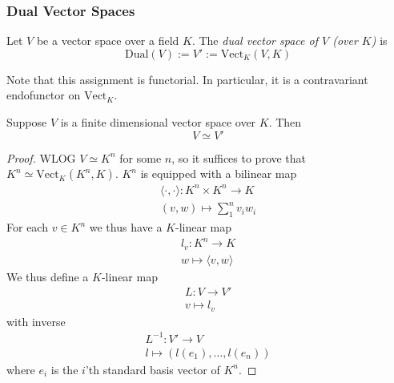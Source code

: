 \subsubsection{Dual Vector Spaces}
    \begin{definition}
        Let $V$ be a vector space over a field $K$. The \emph{dual vector space of $V$ (over $K$)} is 
        $$
            \mathrm{Dual}(V):=V' := \mathrm{Vect}_K(V,K)
        $$
    \end{definition}   
    \begin{remark}
        Note that this assignment is functorial. In particular, it is a contravariant endofunctor on $\mathrm{Vect}_K$. 
    \end{remark} 
    \begin{lemma}
        Suppose $V$ is a finite dimensional vector space over $K$. Then 
        $$
            V\simeq V'
        $$
    \end{lemma}
    \begin{proof}
        WLOG $V\simeq K^n$ for some $n$, so it suffices to prove that $K^n\simeq \mathrm{Vect}_K(K^n,K)$. $K^n$ is equipped with a bilinear map 
        \begin{gather*}
            \langle \cdot,\cdot\rangle : K^n\times K^n \rightarrow K\\
            (v,w)\mapsto \sum_1^n v_iw_i
        \end{gather*} 
        For each $v\in K^n$ we thus have a $K$-linear map
        \begin{gather*}
            l_v : K^n \rightarrow K\\
            w\mapsto \langle v,w\rangle 
        \end{gather*}
        We thus define a $K$-linear map 
        \begin{gather*}
            L : V\rightarrow V'\\
            v\mapsto l_v
        \end{gather*}
        with inverse 
        \begin{gather*}
            L^{-1}: V'\rightarrow V\\
            l\mapsto (l(e_1),\dots,l(e_n))
        \end{gather*}
        where $e_i$ is the $i$'th standard basis vector of $K^n$.
    \end{proof}
